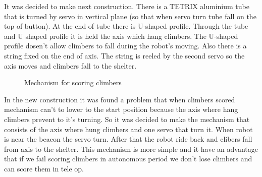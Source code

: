 \begin{enumerate*}
    \item It was decided to make next construction. There is a TETRIX aluminium tube that  is turned by servo in vertical plane (so that when servo turn tube fall on the top of button). At the end of tube there is U-shaped profile. Through the tube and U shaped profile it is held the axis which hang climbers. The U-shaped profile dosen't allow climbers to fall during the robot's moving. Also there is a string fixed on the end of axis. The string is reeled by the second servo so the axis moves and climbers fall to the shelter.
    \begin{figure}[h]
    	\begin{minipage}[h]{1\linewidth}
    		\caption{Mechanism for scoring climbers}
    	\end{minipage}
    \end{figure}
    
    \item In the new construction it was found a problem that when climbers scored mechanism can't to lower to the start position because the axis where hang climbers prevent to it's turning. So it was decided to make the mechanism that consists of the axis where hung climbers and  one servo that turn it. When robot is near the beacon the servo turn. After that the robot ride back and clibers fall from axis to the shelter. This mechanism is more simple and it have an advantage that if we fail scoring climbers in autonomous period we don't lose climbers and can score them in tele op.
  
  \end{enumerate*}	
  
  
  